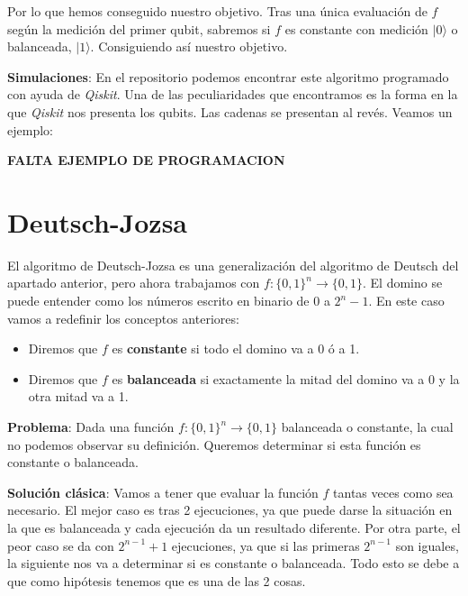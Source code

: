 Por lo que hemos conseguido nuestro objetivo. Tras una única evaluación de $f$ según la medición del primer qubit, sabremos si $f$ es constante con medición $|0\rangle$ o balanceada, $|1\rangle$. Consiguiendo así nuestro objetivo.\newline

\textbf{Simulaciones}: En el repositorio podemos encontrar este algoritmo programado con ayuda de \textit{Qiskit}. Una de las peculiaridades que encontramos es la forma en la que \textit{Qiskit} nos presenta los qubits. Las cadenas se presentan al revés. Veamos un ejemplo:

\textbf{FALTA EJEMPLO DE PROGRAMACION}

\section{Deutsch-Jozsa}
\label{Sec3.3:Deutsch-Jozsa}
 El algoritmo de Deutsch-Jozsa\cite{B:QuantumScientist:2008} es una generalización del algoritmo de Deutsch del apartado anterior, pero ahora trabajamos con $f:\{0,1\}^{n} \rightarrow\{0,1\}$. El domino se puede entender como los números escrito en binario de 0 a $2^{n}-1$. En este caso vamos a redefinir los conceptos anteriores:

 \begin{itemize}
     \item Diremos que $f$ es \textbf{constante} si todo el domino va a 0 ó a 1.
     \item Diremos que $f$ es \textbf{balanceada} si exactamente la mitad del domino va a 0 y la otra mitad va a 1.
 \end{itemize}

 \textbf{Problema}\label{P:DJ}: Dada una función $f:\{0,1\}^{n} \rightarrow\{0,1\}$ balanceada o constante, la cual no podemos observar su definición. Queremos determinar si esta función es constante o balanceada.\newline

 \textbf{Solución clásica}: Vamos a tener que evaluar la función $f$ tantas veces como sea necesario. El mejor caso es tras 2 ejecuciones, ya que puede darse la situación en la que es balanceada y cada ejecución da un resultado diferente. Por otra parte, el peor caso se da con $2^{n-1}+1$ ejecuciones, ya que si las primeras $2^{n-1}$ son iguales, la siguiente nos va a determinar si es constante o balanceada. Todo esto se debe a que como hipótesis tenemos que es una de las 2 cosas. \newline

